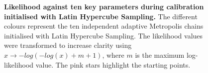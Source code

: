 \begin{figure}[ht]
    \caption{\textbf{  
	Likelihood against ten key parameters during calibration initialised with Latin Hypercube Sampling.    
    } 
The different colours represent the ten independent adaptive Metropolis chains initialised with Latin Hypercube Sampling. The likelihood values were transformed to increase clarity using $x \rightarrow -log(-log(x) + m + 1)$, where $m$ is the maximum log-likelihood value. The pink stars highlight the starting points.     
    }
    \label{fig:lhs_experiments_likelihood}
\end{figure}


